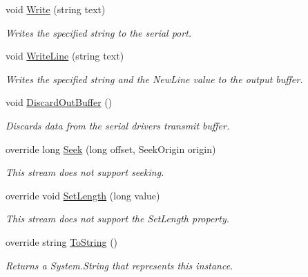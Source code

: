 \begin{DoxyCompactItemize}
void \mbox{\hyperlink{class_r_j_c_p_1_1_i_o_1_1_ports_1_1_serial_port_stream_a115adfff096537f4b753ff4de95bb438}{Write}} (string text)
\begin{DoxyCompactList}\small\item\em Writes the specified string to the serial port. \end{DoxyCompactList}\item 
void \mbox{\hyperlink{class_r_j_c_p_1_1_i_o_1_1_ports_1_1_serial_port_stream_a83043ac5b89d4ea4d55c06b3a032a36d}{Write\+Line}} (string text)
\begin{DoxyCompactList}\small\item\em Writes the specified string and the New\+Line value to the output buffer. \end{DoxyCompactList}\item 
void \mbox{\hyperlink{class_r_j_c_p_1_1_i_o_1_1_ports_1_1_serial_port_stream_ae46fd933ae0a74c420b6a65fffb0b882}{Discard\+Out\+Buffer}} ()
\begin{DoxyCompactList}\small\item\em Discards data from the serial driver\textquotesingle{}s transmit buffer. \end{DoxyCompactList}\item 
override long \mbox{\hyperlink{class_r_j_c_p_1_1_i_o_1_1_ports_1_1_serial_port_stream_a2b38eca4d69c1e37cec7aa3628a2ce3f}{Seek}} (long offset, Seek\+Origin origin)
\begin{DoxyCompactList}\small\item\em This stream does not support seeking. \end{DoxyCompactList}\item 
override void \mbox{\hyperlink{class_r_j_c_p_1_1_i_o_1_1_ports_1_1_serial_port_stream_aef4e6e744f359d9da4b6e3cb957668d7}{Set\+Length}} (long value)
\begin{DoxyCompactList}\small\item\em This stream does not support the Set\+Length property. \end{DoxyCompactList}\item 
override string \mbox{\hyperlink{class_r_j_c_p_1_1_i_o_1_1_ports_1_1_serial_port_stream_a7aebb6a1674be70dc5d9501a96f67e03}{To\+String}} ()
\begin{DoxyCompactList}\small\item\em Returns a System.\+String that represents this instance. \end{DoxyCompactList}\end{DoxyCompactItemize}
